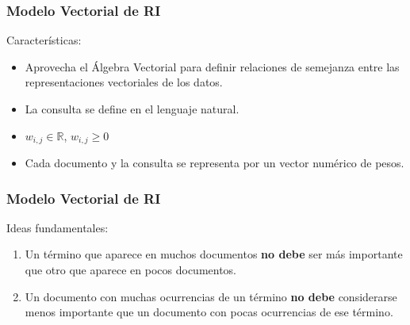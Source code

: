 \documentclass[
10pt, %
aspectratio=169, %
]{beamer}
\begin{document}
	\begin{frame}
		
		\frametitle{Modelo Vectorial de RI}
		
		Características:
		\begin{itemize}
			
			\item Aprovecha el Álgebra Vectorial para definir relaciones de semejanza entre las representaciones vectoriales de los datos. \\[2mm]
			
			\item La consulta se define en el lenguaje natural. \\[2mm]
			
			\item $w_{i, j} \in \mathbb{R}$, $w_{i, j} \geq 0$ \\[2mm]
			
			\item Cada documento y la consulta se representa por un vector numérico de pesos.
			
		\end{itemize}
		
	\end{frame}
	
	\begin{frame}
		
		\frametitle{Modelo Vectorial de RI}
		
		Ideas fundamentales:
		\begin{enumerate}
			
			\item Un término que aparece en muchos documentos \textbf{no debe} ser más importante que otro que aparece en pocos documentos. \\[2mm]
			
			\item Un documento con muchas ocurrencias de un término \textbf{no debe} considerarse menos importante que un documento con pocas ocurrencias de ese término.
			
		\end{enumerate}
		
	\end{frame}
	
\end{document}
